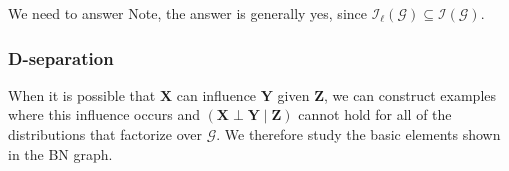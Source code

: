 \documentclass{article}
\begin{document}

We need to answer  Note, the answer is generally yes, since $\mathcal{I}_{\ell}(\mathcal{G})\subseteq \mathcal{I}(\mathcal{G})$.
\subsubsection{D-separation}
When it is possible that $\boldsymbol{X}$ can influence $\boldsymbol{Y}$ given $\boldsymbol{Z}$, we can construct examples where this influence occurs and $(\boldsymbol{X} \perp \boldsymbol{Y} \mid \boldsymbol{Z})$ cannot hold for all of the distributions that factorize over $\mathcal{G}$. We therefore study the basic elements shown in the BN graph.
\end{document}

